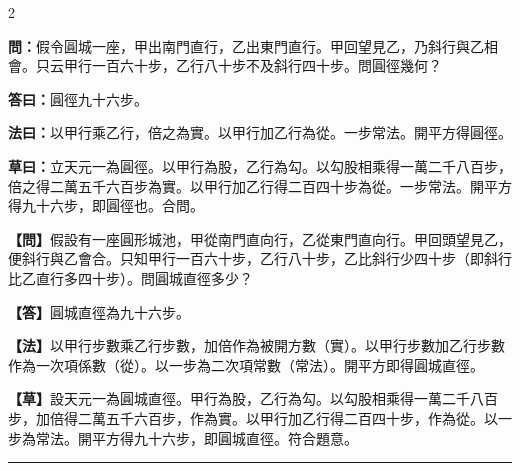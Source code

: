 \documentclass[11pt,a4paper]{article}
\newcommand{\longline}{\noindent\rule{\textwidth}{0.4pt}}
\newcommand{\wenC}[1]{\par\noindent\textbf{\textcolor{probcolor}{問：}}{#1}\par}
\newcommand{\daC}[1]{\par\noindent\textbf{\textcolor{anscolor}{答曰：}}{#1}\par}
\newcommand{\fayueC}[1]{\par\noindent\textbf{\textcolor{methodcolor}{法曰：}}{#1}\par}
\newcommand{\caoyueC}[1]{\par\noindent\textbf{草曰：}{#1}\par}
\newcommand{\wenM}[1]{\par\noindent\textbf{\textcolor{probcolor}{【問】}}{#1}\par}
\newcommand{\daM}[1]{\par\noindent\textbf{\textcolor{anscolor}{【答】}}{#1}\par}
\newcommand{\fayueM}[1]{\par\noindent\textbf{\textcolor{methodcolor}{【法】}}{#1}\par}
\newcommand{\caoyueM}[1]{\par\noindent\textbf{【草】}{#1}\par}
\begin{document}
\begin{paracol}{2}

\wenC{假令圓城一座，甲出南門直行，乙出東門直行。甲回望見乙，乃斜行與乙相會。只云甲行一百六十步，乙行八十步不及斜行四十步。問圓徑幾何？}

\daC{圓徑九十六步。}

\fayueC{以甲行乘乙行，倍之為實。以甲行加乙行為從。一步常法。開平方得圓徑。}

\caoyueC{立天元一為圓徑。以甲行為股，乙行為勾。以勾股相乘得一萬二千八百步，倍之得二萬五千六百步為實。以甲行加乙行得二百四十步為從。一步常法。開平方得九十六步，即圓徑也。合問。}

\switchcolumn

\wenM{假設有一座圓形城池，甲從南門直向行，乙從東門直向行。甲回頭望見乙，便斜行與乙會合。只知甲行一百六十步，乙行八十步，乙比斜行少四十步（即斜行比乙直行多四十步）。問圓城直徑多少？}

\daM{圓城直徑為九十六步。}

\fayueM{以甲行步數乘乙行步數，加倍作為被開方數（實）。以甲行步數加乙行步數作為一次項係數（從）。以一步為二次項常數（常法）。開平方即得圓城直徑。}

\caoyueM{設天元一為圓城直徑。甲行為股，乙行為勾。以勾股相乘得一萬二千八百步，加倍得二萬五千六百步，作為實。以甲行加乙行得二百四十步，作為從。以一步為常法。開平方得九十六步，即圓城直徑。符合題意。}

\end{paracol}

\vspace{0.3cm}
\longline
\end{document}
